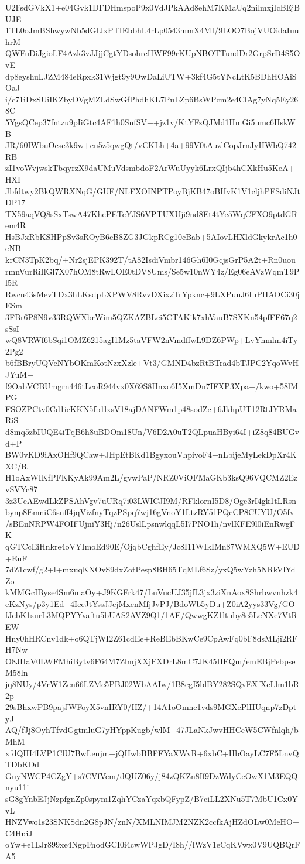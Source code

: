U2FsdGVkX1+e04Gvk1DFDHmspoP9x0VdJPkAAd8ehM7KMaUq2nilmxjIcBEjBUJE
1TL0oJmBShwywNb5dGIJxPTIEbbhL4rLp0543mmX4MI/9LOO7BojVUOidaIuuhrM
QWFuDiJgioLF4Azk3vJJjjCgtYDsohrcHWF99rKUpNBOTTundDr2GrpSrD4S5OvE
dp8eyshuLJZM484eRpxk31Wjgt9y9OwDaLiUTW+3kf4G5tYNcLtK5BDhHOAiSOaJ
i/c71iDxSUiIKZbyDVgMZLdSwGfPhdhKL7PuLZp6BsWPcm2e4ClAg7yNq5Ey268C
5YgsQCep37fntzu9pIiGtc4AF1h0SnfSV++jz1v/KtYFzQJMd1HmGi5umc6HskWB
JR/60IWbuOcsc3k9w+cn5z5qwgQt/vCKLh+4a+99V0tAuzlCopJrnJyHWbQ742RB
zI1voWvjwskTbqyrzX9daUMuVdsmbdoF2ArWuUyyk6LrxQIjb4hCXkHu5KeA+HXI
Jbfdtwy2BkQWRXNqG/GUF/NLFXOINPTPoyBjKB47oBHvK1V1cljhPFSdiNJtDP17
TX59aqVQ8sSxTswA47KhePETcYJS6VPTUXUji9nd8Et4tYe5WqCFXO9ptdGRem4R
HsBJxRbKSHPpSv3sROyB6cB8ZG3JGkpRCg10cBab+5AIovLHXldGkykrAc1h0eNB
krCN3TpK2bq/+Nr2sjEPK392T/tA82IsdiVmbr146Gh6I0GcjsGrP5A2t+Rn0uou
rmnVurRiIlGl7X07hOM8tRwLOE0tDV8Ums/Se5w10nWY4z/Eg06eAVzWqmT9Pl5R
Rwcu43sMevTDx3hLKsdpLXPWV8RvvDXixzTrYpknc+9LXPuuJ6IuPHAOCi30jESm
3FBr6P8N9v33RQWXbrWim5QZKAZBLci5CTAKik7xhVauB7SXKn54pfFF67q2sSsI
wQ8VRWf6bSqi1OMZ6215agI1Mz5taVFW2nVmdffwL9DZ6PWp+LvYhmlm4iTy2Pg2
b6fBBryUQVeNYbOKmKotNzxXzle+Vt3/GMND4bzRtBTrad4bTJPC2YqoWvHJYuM+
f9OabVCBUmgrn446tLcoR944vx0X69S8Hnxo6I5XmDn7IFXP3Xpa+/kwo+58lMPG
FSOZPCtv0Cd1ieKKN5fb1lxsV18ajDANFWm1p48sodZc+6JkhpUT12RtJYRMaRiS
d8mq5zbIUQE4iTqB6h8uBDOm18Un/V6D2A0uT2QLpuaHByi64I+iZ8q84BUGvd+P
BW0vKD9iAxOHf9QCaw+JHpEtBKd1BgyxouVhpivoF4+nLbijeMyLekDpXr4KXC/R
H1oAxWIKfPFKKyAk99Am2L/gvwPaP/NRZ0ViOFMaGKb3ksQ96VQCMZ2EzvSVYc87
3z3UeAEwdLkZPSAhVgv7uURq7i03LWICJI9M/RFklornI5D8/Oge3rI4gk1tLRsn
bynp8EmniC6snff4jqVizfnyTqzPSpq7wj16gVnoY1LtzRY51PQcCP8CUYU/O5fv
/sBEnNRPW4FOIFUjniY3Hj/n26UslLpsnwlqqL5I7PNO1h/nvlKFE9l0iEnRwgFK
qGTCcEiHnkre4oVYImoEd90E/OjqbCghfEy/Jc8I11WIkIMn87WMXQ5W+EUD+EuF
7dZ1cwf/g2+l+mxuqKNOvS9dxZotPesp8BH65TqMLf6Sz/yxQ5wYzh5NRkVlYdZo
kMMGcIByse4Sm6maOy+J9KGFrk47/LuVucUJ35jfL3jx3ziXnAox8Shrbwvnhzk4
cKzNys/p3y1Ed+4IeeJtYssJJcjMxenMfjJvPJ/BdoWb5yDu+Z0iA2yys33Vg/GO
fJebK1surL3MQPYYvaftu5bUAS2AVZ9Q1/1AE/QwwgKZ1ltuby8e5LcNXe7VtREW
Hny0hHRCnv1dk+o6QTjWI2Z61cdEe+ReBEbBKwCe9CpAwFq0bF8dsMLji2RFH7Nw
O8JHaV0LWFMhiBytv6F64M7ZlmjXXjFXDrL8mC7JK45HEQm/emEBjPebpseM58ln
jq8NUy/4VrW1Zcn66LZMc5PBJ02WbAAIw/1B8egI5blBY282SQvEXfXcLlm1bR2p
29sBhxwPB9pajJWFoyX5vnIRY0/HZ/+14A1oOmnc1vds9MGXePlIIUqnp7zDptyJ
AQ/fJj8OyhTfvdGgtmluG7yHYppKugb/wlM+47JLaNkJwvHHCeW5CWfnlqh/bMhM
xfdQIH4LVP1ClU7BwLenjm+jQHwbBBFFYaXWvR+6xbC+HbOayLC7F5LnvQTDbKDd
GuyNWCP4CZgY+s7CVfVem/dQUZ06y/j84zQKZn8If9DzWdyCeOwX1M3EQQnyu11i
sG8gYnbEJjNzpfgnZp0spym1ZqhYCzaYqxbQFypZ/B7ciLL2XNu5T7MbU1Cx0YvL
HNZVwo1s23SNKSdn2G8pJN/znN/XMLNIMJM2NZK2ccfkAjHZdOLw0MeHO+C4HuiJ
oYw+e1LJr899xe4NgpFnodGCI0i4cwWPJgD/I8h//lWzV1eCqKVwx0V9UQBQrFA5
